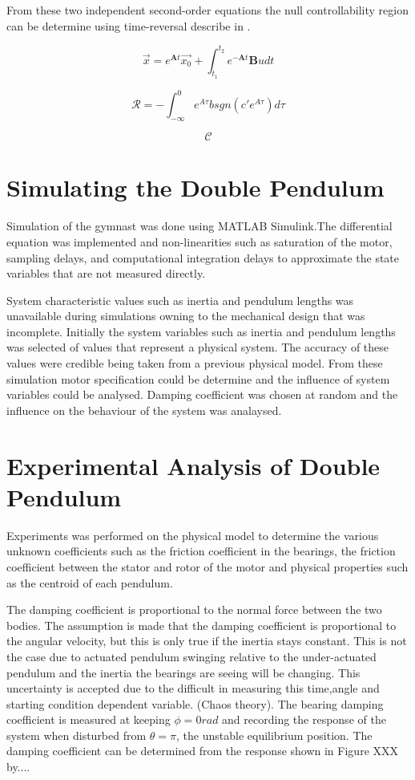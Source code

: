 \documentclass[a4paper,12pt]{article}
\begin{document}
	From these two independent second-order equations the null controllability region can be determine using time-reversal describe in \cite{null_controllability}.
	
	$$ \vec{x} = e^{\boldsymbol{A}t}\vec{x_{0}} + \int_{t_{1}}^{t_{2}} e^{-\boldsymbol{A}t}\boldsymbol{B}u dt $$ 
	
	$$\mathcal{R} = {-\int_{-\infty}^{0} e^{A\tau}bsgn(c'e^{A\tau})d\tau }  $$
	
	$$\mathcal{C} $$ 
	
	
	
	\section{Simulating the Double Pendulum}
	
	Simulation of the gymnast was done using MATLAB Simulink.The differential equation was implemented and non-linearities such as saturation of the motor, sampling delays, and computational integration delays to approximate the state variables that are not measured directly. 
	
	System characteristic values such as inertia and pendulum lengths was unavailable during simulations owning to the mechanical design that was incomplete. Initially the system variables such as inertia and pendulum lengths was selected of values that represent a physical system. The accuracy of these values were credible being taken from a previous physical model. From these simulation motor specification could be determine and the influence of system variables could be analysed. Damping coefficient was chosen at random and the influence on the behaviour of the system was analaysed.
	
	\section{Experimental Analysis of Double Pendulum}
	
	Experiments was performed on the physical model to determine the various unknown coefficients such as the friction coefficient in the bearings, the friction coefficient between the stator and rotor of the motor and physical properties such as the centroid of each pendulum. 
	
	The damping coefficient is proportional to the normal force between the two bodies. The assumption is made that the damping coefficient is proportional to the angular velocity, but this is only true if the inertia stays constant. This is not the case due to actuated pendulum swinging relative to the under-actuated pendulum and the inertia the bearings are seeing will be changing. This uncertainty is accepted due to the difficult in measuring this time,angle and starting condition dependent variable. (Chaos theory). The bearing damping coefficient is measured at keeping $\phi = 0 rad$ and recording the response of the system when disturbed from $\theta = \pi$, the unstable equilibrium position. The damping coefficient can be determined from the response shown in Figure XXX by....
	
\end{document}
